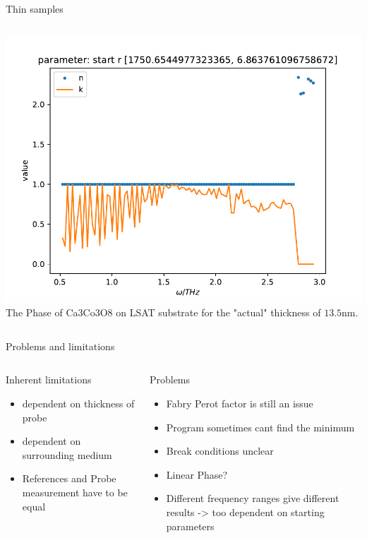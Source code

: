 \documentclass[aspectratio=1610, 9pt]{beamer}
\begin{document}
\begin{frame}{Thin samples}
\begin{columns}
    \begin{column}{0.33\textwidth}
      \includegraphics[width=\textwidth]{images/2donSub/frequncy_against_n_k.pdf}
      {The Phase of Ca3Co3O8 on LSAT substrate for the "actual" thickness of $13.5\si{\nano\meter}$.}      
    \end{column}
    \end{columns}
\end{frame}

\begin{frame}{Problems and limitations}
  \begin{columns}
    \begin{column}{0.5\textwidth}
      Inherent limitations
      \begin{itemize}
        \item dependent on thickness of probe
        \item dependent on surrounding medium
        \item References and Probe measurement have to be equal
      \end{itemize}
    \end{column} 
    \begin{column}{0.5\textwidth}
      Problems
      \begin{itemize}
        \item Fabry Perot factor is still an issue
        \item Program sometimes cant find the minimum
        \item Break conditions unclear 
        \item Linear Phase?
        \item Different frequency ranges give different results -> too dependent on starting parameters 
      \end{itemize}
    \end{column}
  \end{columns}
\end{frame}
\end{document}
